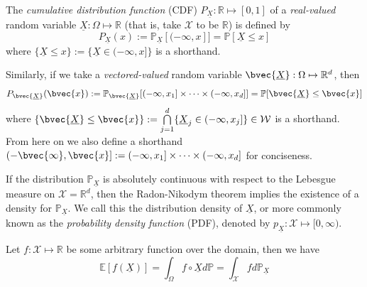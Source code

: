 \documentclass[twoside]{article} \usepackage{aistats2017}
\newcommand{\rv}[1]{\underline{#1}}
\begin{document}
		The \textit{cumulative distribution function} (CDF) $P_{\rv{X}} : \mathbb{R} \mapsto [0, 1]$ of a \textit{real-valued} random variable $\rv{X} : \Omega \mapsto \mathbb{R}$ (that is, take $\mathcal{X}$ to be $\mathbb{R}$) is defined by
		\begin{equation}
			P_{\rv{X}}(x) := \mathbb{P}_{\rv{X}}[(-\infty, x]] = \mathbb{P}[\rv{X} \leq x]
		\label{eq:cdf}
		\end{equation}
		where $\{\rv{X} \leq x\} := \{\rv{X} \in (-\infty, x]\}$ is a shorthand.

		Similarly, if we take a \textit{vectored-valued} random variable $\bvec{\rv{X}} : \Omega \mapsto \mathbb{R}^{d}$, then 
		\begin{equation}
			P_{\bvec{\rv{X}}}(\bvec{x}) := \mathbb{P}_{\bvec{\rv{X}}}[(-\infty, x_{1}] \times \dots \times (-\infty, x_{d}]] = \mathbb{P}[\bvec{\rv{X}} \leq \bvec{x}]
		\label{eq:cdf_vector}
		\end{equation}
		where $\{\bvec{\rv{X}} \leq \bvec{x}\} := \bigcap\limits_{j = 1}^{d} \{\rv{X}_{j} \in (-\infty, x_{j}]\} \in \mathcal{W}$ is a shorthand. From here on we also define a shorthand $(-\bvec{\infty}, \bvec{x}] := (-\infty, x_{1}] \times \dots \times (-\infty, x_{d}]$ for conciseness.
				
		
		If the distribution $\mathbb{P}_{\rv{X}}$ is absolutely continuous with respect to the Lebesgue measure on $\mathcal{X} = \mathbb{R}^{d}$, then the Radon-Nikodym theorem implies the existence of a density for $\mathbb{P}_{\rv{X}}$. We call this the distribution density of $\rv{X}$, or more commonly known as the \textit{probability density function} (PDF), denoted by $p_{\rv{X}}: \mathcal{X} \mapsto [0, \infty)$.
		
		Let $f : \mathcal{X} \mapsto \mathbb{R}$ be some arbitrary function over the domain, then we have
		\begin{equation}
			\mathbb{E}[f(\rv{X})] = \int_{\Omega} f \circ \rv{X} d \mathbb{P} = \int_{\mathcal{X}} f d \mathbb{P}_{\rv{X}}
		\label{eq:functional_expectation}
		\end{equation}
		
\end{document}
